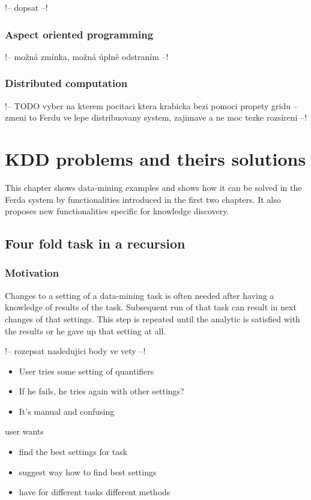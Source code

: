 \documentclass[a4paper,12pt]{book}
\begin{document}
!-- dopsat --!

\subsection{Aspect oriented programming}

!-- možná zmínka, možná úplně odstraním --!

\subsection{Distributed computation}
!-- TODO vyber na kterem pocitaci ktera krabicka bezi pomoci propety gridu -- zmeni to Ferdu ve lepe distribuovany system, zajimave a ne moc tezke rozsireni --!

\chapter{KDD problems and theirs solutions}
\label{chap:KDDExamples}
This chapter shows data-mining examples and shows how it can be solved in the Ferda system by functionalities introduced in the first two chapters. It also proposes new functionalities specific for knowledge discovery.

\section{Four fold task in a recursion}
\subsection{Motivation}
Changes to a setting of a data-mining task is often needed after having a knowledge of results of the task. Subsequent run of that task can result in next changes of that settings. This step is repeated until the analytic is satisfied with the results or he gave up that setting at all.

!-- rozepsat nasledujici body ve vety --!

\begin{itemize}
			\item User tries some setting of quantifiers
			\item If he fails, he tries again with other settings?
			\item It's manual and confusing
\end{itemize}
		user wants
		\begin{itemize}
			\item find the best settings for task
			\item suggest way how to find best settings
			\item have for different tasks different methods
		\end{itemize}
\end{document}
